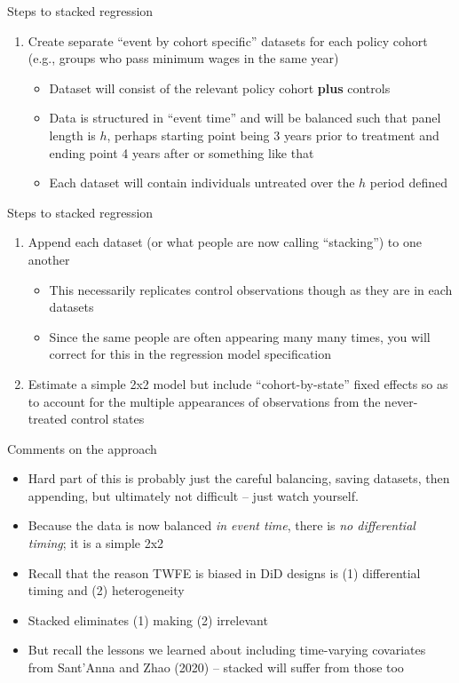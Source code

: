 \documentclass{beamer}
\begin{document}
\begin{frame}{Steps to stacked regression}
\begin{enumerate}
    \item Create separate ``event by cohort specific'' datasets for each policy cohort (e.g., groups who pass minimum wages in the same year)
        \begin{itemize}
        \item Dataset will consist of the relevant policy cohort \textbf{plus} controls
        \item Data is structured in ``event time'' and will be balanced such that panel length is $h$, perhaps starting point being 3 years prior to treatment and ending point 4 years after or something like that
        \item Each dataset will contain individuals untreated over the $h$ period defined
        \end{itemize}
\end{enumerate}
\end{frame}

\begin{frame}{Steps to stacked regression}
\begin{enumerate}
    \item Append each dataset (or what people are now calling ``stacking'') to one another
        \begin{itemize}
        \item This necessarily replicates control observations though as they are in each datasets
        \item Since the same people are often appearing many many times, you will correct for this in the regression model specification
        \end{itemize}
    \item Estimate a simple 2x2 model but include ``cohort-by-state'' fixed effects so as to account for the multiple appearances of observations from the never-treated control states
\end{enumerate}
\end{frame}

\begin{frame}{Comments on the approach}

\begin{itemize}
\item Hard part of this is probably just the careful balancing, saving datasets, then appending, but ultimately not difficult -- just watch yourself.
\item Because the data is now balanced \emph{in event time}, there is \emph{no differential timing}; it is a simple 2x2
\item Recall that the reason TWFE is biased in DiD designs is (1) differential timing and (2) heterogeneity
\item Stacked eliminates (1) making (2) irrelevant
\item But recall the lessons we learned about including time-varying covariates from Sant'Anna and Zhao (2020) -- stacked will suffer from those too
\end{itemize}

\end{frame}
\end{document}
